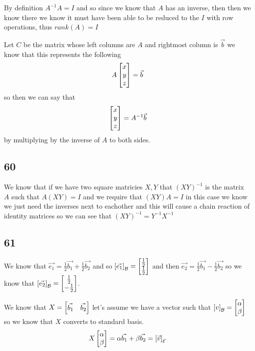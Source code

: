 \documentclass[11pt]{book}
\begin{document}
By definition $A^{-1} A = I$ and so since we know that $A$ has an inverse, then then we know there we know it must have been able to be reduced to the $I$ with row operations, thus $\mathit{rank} \left(A\right) = I$ 

\begin{eg}
    Let $C$ be the matrix whose left columns are $A$ and rightmost column is $\vec{b} $ we know that this represents the following 
    \[
    A \begin{bmatrix} x \\ y \\ z \end{bmatrix} = \vec{b} 
    \]
    so then we can say that
    \[
    \begin{bmatrix} x \\ y \\ z \end{bmatrix} = A^{-1} \vec{b} 
    \]
    by multiplying by the inverse of $A$ to both sides.
\end{eg}


\subsection*{60}%
\label{sub:60}

We know that if we have two square matricies $X,Y$ that $\left( XY \right) ^{-1} $ is the matrix $A$ such that $A\left( XY \right) = I$ and we require that $\left( XY \right) A= I$ in this case we know we just need the inverses next to eachother and this will cause a chain reaction of identity matrices so we can see that $\left( XY \right) ^{-1} = Y^{-1} X^{-1} $ 


\subsection*{61}%
\label{sub:61}

We know that $ \vec{e_1} = \frac{1}{2}\vec{b_1} + \frac{1}{2}\vec{b_2} $ and so $\left[ \vec{e_1}  \right]_{\mathcal{B}} = \begin{bmatrix} \frac{1}{2} \\ \frac{1}{2} \end{bmatrix} $ and then $\vec{e_2} = \frac{1}{2}\vec{b_1}  - \frac{1}{2}\vec{b_2} $ so we know that $\left[ \vec{e_2}  \right]_{\mathcal{B}} = \begin{bmatrix} \frac{1}{2} \\ -\frac{1}{2} \end{bmatrix} $. 

We know that $X= \begin{bmatrix} \vec{b_1}  & \vec{b_2}  \end{bmatrix}$ let's assume we have a vector such that $\left[ v \right]_{\mathcal{B}} = \begin{bmatrix} \alpha  \\ \beta  \end{bmatrix} $  so we know that $X$ converts to standard basis.
\begin{equation*}
    X\begin{bmatrix} \alpha  \\ \beta  \end{bmatrix} = \alpha \vec{b_1}  + \beta \vec{b_2} = \left[ \vec{v}  \right]_{\mathcal{E}} 
\end{equation*}
\end{document}
